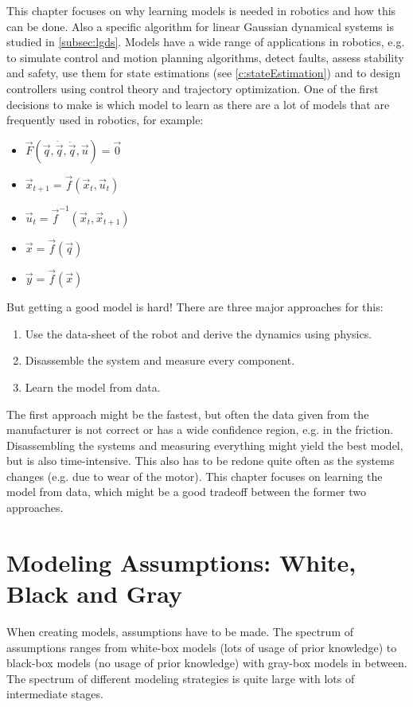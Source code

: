 	This chapter focuses on why learning models is needed in robotics and how this can be done. Also a specific algorithm for linear Gaussian dynamical systems is studied in \autoref{subsec:lgds}. Models have a wide range of applications in robotics, e.g. to simulate control and motion planning algorithms, detect faults, assess stability and safety, use them for state estimations (see \autoref{c:stateEstimation}) and to design controllers using control theory and trajectory optimization. One of the first decisions to make is which model to learn as there are a lot of models that are frequently used in robotics, for example:
	\begin{itemize}
		\item {}       \( \vec{F}(\vec{q}, \dot{\vec{q}}, \ddot{\vec{q}}, \vec{u}) = \vec{0} \)
		\item {} \( \vec{x}_{t + 1} = \vec{f}(\vec{x}_t, \vec{u}_t) \)
		\item {} \( \vec{u}_t = \vec{f}^{-1}(\vec{x}_t, \vec{x}_{t + 1}) \)
		\item {}                     \( \vec{x} = \vec{f}(\vec{q}) \)
		\item {}                        \( \vec{y} = \vec{f}(\vec{x}) \)
	\end{itemize}
	But getting a good model is hard! There are three major approaches for this:
	\begin{enumerate}
		\item Use the data-sheet of the robot and derive the dynamics using physics.
		\item Disassemble the system and measure every component.
		\item Learn the model from data.
	\end{enumerate}
	The first approach might be the fastest, but often the data given from the manufacturer is not correct or has a wide confidence region, e.g. in the friction. Disassembling the systems and measuring everything might yield the best model, but is also time-intensive. This also has to be redone quite often as the systems changes (e.g. due to wear of the motor). This chapter focuses on learning the model from data, which might be a good tradeoff between the former two approaches.

	\section{Modeling Assumptions: White, Black and Gray}
		When creating models, assumptions have to be made. The spectrum of assumptions ranges from white-box models (lots of usage of prior knowledge) to black-box models (no usage of prior knowledge) with gray-box models in between. The spectrum of different modeling strategies is quite large with lots of intermediate stages.

